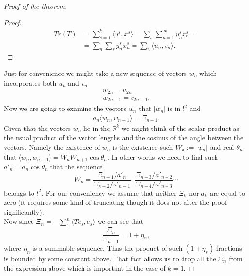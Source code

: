 \begin{proof}[Proof of the theorem]
\begin{proof}
            \begin{equation}
              \begin{split}
                  Tr(T) &= \sum_{s=1}^k \langle y^s, x^s \rangle = \sum_s \sum_{n=1}^\infty y^s_n x^s_n =\\
                        &= \sum_n \sum_s y^s_n x^s_n = \sum_n \langle u_n, v_n \rangle.
              \end{split}
            \end{equation}
        \end{proof}
        Just for convenience we might take a new sequence of vectors $w_n$ which incorporates both $u_n$ and $v_n$
        \begin{align*}
            w_{2n} = u_{2n}\\
            w_{2n + 1} = v_{2n + 1}.
        \end{align*}
        Now we are going to examine the vectors $w_n$ that $|w_n|$ is in $l^2$ and
        \begin{align*}
            a_{n} \langle w_{n}, w_{n - 1}\rangle = \Xi_{n - 1}.
        \end{align*}
        Given that the vectors $w_n$ lie in the $\mathbb{R}^k$ we might think of the scalar product as
        the usual product of the vector lengths and the cosinus of the angle between the vectors.
        Namely the existence of $w_n$ is the existence such $W_n := |w_n|$ and real $\theta_n$ that
        $\langle w_{n}, w_{n+1}\rangle = W_n W_{n+1} \cos{\theta_n}.$
        In other words we need to find such $a'_n = a_n \cos{\theta_n}$ that
        the sequence
        $$
          W_n = \frac{\Xi_{n-1}/a'_n}{\Xi_{n-2}/a'_{n-1}} \cdot \frac{\Xi_{n-3}/a'_{n-2}}{\Xi_{n-4}/a'_{n-3}} \cdots
        $$
        belongs to $l^2$. For our conveniency we assume that neither $\Xi_k$ nor $a_k$ are equal to zero (it requires some kind of truncating though it does not alter the proof significantly).\\
        Now since $\Xi_n = -\sum_1^n \langle Te_s, e_s\rangle$ we can see that
        $$
            \frac{\Xi_n}{\Xi_{n-1}} = 1 + \eta_n,
        $$
        where $\eta_n$ is a summable sequence. Thus the product of such $(1 + \eta_s)$ fractions is bounded by 
        some constant above. That fact allows us to drop all the $\Xi_n$ from the expression above which is important in the
        case of $k = 1$.
        

\end{proof}
